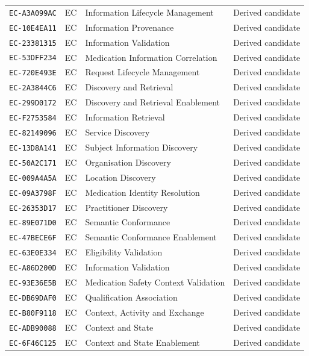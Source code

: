 \documentclass[11pt,a4paper,openany]{book}
\begin{document}
\begin{longtable}{@{}p{.19\linewidth}p{.12\linewidth}p{.39\linewidth}p{.24\linewidth}@{}}
\texttt{EC-A3A099AC} & EC & Information Lifecycle Management & Derived candidate \\
\texttt{EC-10E4EA11} & EC & Information Provenance & Derived candidate \\
\texttt{EC-23381315} & EC & Information Validation & Derived candidate \\
\texttt{EC-53DFF234} & EC & Medication Information Correlation & Derived candidate \\
\texttt{EC-720E493E} & EC & Request Lifecycle Management & Derived candidate \\
\texttt{EC-2A3844C6} & EC & Discovery and Retrieval & Derived candidate \\
\texttt{EC-299D0172} & EC & Discovery and Retrieval Enablement & Derived candidate \\
\texttt{EC-F2753584} & EC & Information Retrieval & Derived candidate \\
\texttt{EC-82149096} & EC & Service Discovery & Derived candidate \\
\texttt{EC-13D8A141} & EC & Subject Information Discovery & Derived candidate \\
\texttt{EC-50A2C171} & EC & Organisation Discovery & Derived candidate \\
\texttt{EC-009A4A5A} & EC & Location Discovery & Derived candidate \\
\texttt{EC-09A3798F} & EC & Medication Identity Resolution & Derived candidate \\
\texttt{EC-26353D17} & EC & Practitioner Discovery & Derived candidate \\
\texttt{EC-89E071D0} & EC & Semantic Conformance & Derived candidate \\
\texttt{EC-47BECE6F} & EC & Semantic Conformance Enablement & Derived candidate \\
\texttt{EC-63E0E334} & EC & Eligibility Validation & Derived candidate \\
\texttt{EC-A86D200D} & EC & Information Validation & Derived candidate \\
\texttt{EC-93E36E5B} & EC & Medication Safety Context Validation & Derived candidate \\
\texttt{EC-DB69DAF0} & EC & Qualification Association & Derived candidate \\
\texttt{EC-B80F9118} & EC & Context, Activity and Exchange & Derived candidate \\
\texttt{EC-ADB90088} & EC & Context and State & Derived candidate \\
\texttt{EC-6F46C125} & EC & Context and State Enablement & Derived candidate \\

\end{longtable}
\end{document}
